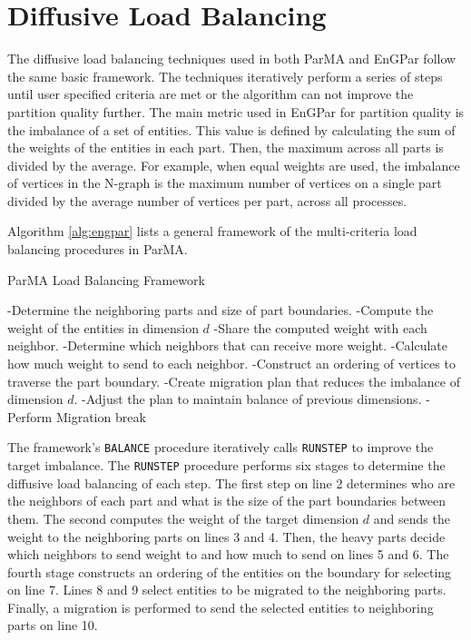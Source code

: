 \section{Diffusive Load Balancing}
The diffusive load balancing techniques used in both ParMA and EnGPar follow
the same basic framework. The techniques iteratively perform a series of steps
until user specified criteria are met or the algorithm can not improve
the partition quality further. The main metric used in EnGPar for partition quality is the imbalance of a set of entities. This value is defined by calculating the sum of the weights of the entities in each part. Then, the maximum across all parts is divided by the average. For example, when equal weights are used, the imbalance of vertices in the N-graph is the maximum number of vertices on a single part divided by the average number of vertices per part, across all processes.

Algorithm \ref{alg:engpar} lists a general
framework of the multi-criteria load balancing procedures in ParMA.

\begin{algorithm}
\caption{ParMA Load Balancing Framework}
\label{alg:engpar}
\small
\begin{algorithmic}[1]
    \State -Determine the neighboring parts and size of part boundaries.
    \State -Compute the weight of the entities in dimension $d$
    \State -Share the computed weight with each neighbor.
    \State -Determine which neighbors that can receive more weight.
    \State -Calculate how much weight to send to each neighbor.
    \State -Construct an ordering of vertices to traverse the part boundary.
    \State -Create migration plan that reduces the imbalance of dimension $d$.
    \State -Adjust the plan to maintain balance of previous dimensions.
    \State -Perform Migration
  \EndProcedure
          \State break
        \EndIf
      \EndWhile
    \EndFor
  \EndProcedure
\end{algorithmic}
\end{algorithm}

The framework's \texttt{BALANCE} procedure iteratively
calls \texttt{RUNSTEP} to improve the
target imbalance. The \texttt{RUNSTEP} procedure performs six
stages to determine the diffusive load balancing of each
step. The first step on line 2 determines who are the
neighbors of each part and what is the size of the part
boundaries between them. The second computes the weight
of the target dimension $d$ and sends the weight to the
neighboring parts on lines 3 and 4. Then, the heavy
parts decide which neighbors to send weight to and how
much to send on lines 5 and 6. The fourth stage constructs
an ordering of the entities on the boundary for selecting
on line 7. Lines 8 and 9 select entities to be migrated
to the neighboring parts. Finally, a migration is performed
to send the selected entities to neighboring parts on line 10.

